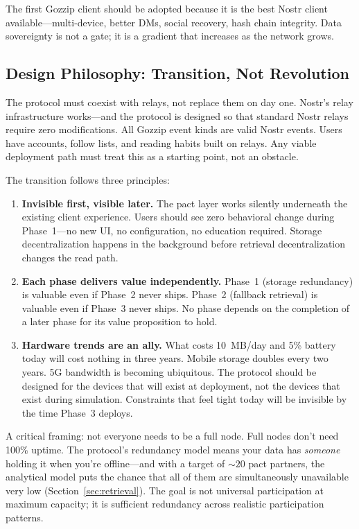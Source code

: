 \documentclass[11pt,a4paper]{article}
\begin{document}
The first Gozzip client should be adopted because it is the best Nostr client available---multi-device, better DMs, social recovery, hash chain integrity. Data sovereignty is not a gate; it is a gradient that increases as the network grows.

\subsection{Design Philosophy: Transition, Not Revolution}

The protocol must coexist with relays, not replace them on day one. Nostr's relay infrastructure works---and the protocol is designed so that standard Nostr relays require zero modifications. All Gozzip event kinds are valid Nostr events. Users have accounts, follow lists, and reading habits built on relays. Any viable deployment path must treat this as a starting point, not an obstacle.

The transition follows three principles:

\begin{enumerate}
  \item \textbf{Invisible first, visible later.} The pact layer works silently underneath the existing client experience. Users should see zero behavioral change during Phase~1---no new UI, no configuration, no education required. Storage decentralization happens in the background before retrieval decentralization changes the read path.
  \item \textbf{Each phase delivers value independently.} Phase~1 (storage redundancy) is valuable even if Phase~2 never ships. Phase~2 (fallback retrieval) is valuable even if Phase~3 never ships. No phase depends on the completion of a later phase for its value proposition to hold.
  \item \textbf{Hardware trends are an ally.} What costs 10~MB/day and 5\% battery today will cost nothing in three years. Mobile storage doubles every two years. 5G bandwidth is becoming ubiquitous. The protocol should be designed for the devices that will exist at deployment, not the devices that exist during simulation. Constraints that feel tight today will be invisible by the time Phase~3 deploys.
\end{enumerate}

A critical framing: not everyone needs to be a full node. Full nodes don't need 100\% uptime. The protocol's redundancy model means your data has \emph{someone} holding it when you're offline---and with a target of ${\sim}20$ pact partners, the analytical model puts the chance that all of them are simultaneously unavailable very low (Section~\ref{sec:retrieval}). The goal is not universal participation at maximum capacity; it is sufficient redundancy across realistic participation patterns.
\end{document}
